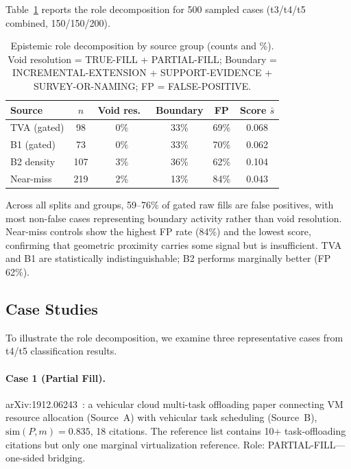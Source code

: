 \documentclass[sigconf]{acmart}
\begin{document}
Table~\ref{tab:roles} reports the role decomposition for 500 sampled cases
(t3/t4/t5 combined, 150/150/200).

\begin{table}[h]
\centering
\caption{Epistemic role decomposition by source group (counts and \%).
Void resolution = TRUE-FILL + PARTIAL-FILL;
Boundary = INCREMENTAL-EXTENSION + SUPPORT-EVIDENCE + SURVEY-OR-NAMING;
FP = FALSE-POSITIVE.}
\label{tab:roles}
\begin{tabular}{lccccc}
\toprule
Source & $n$ & Void res.\ & Boundary & FP & Score $\bar{s}$ \\
\midrule
TVA (gated)     & 98  & 0\%   & 33\%  & 69\% & 0.068 \\
B1 (gated)      & 73  & 0\%   & 33\%  & 70\% & 0.062 \\
B2 density      & 107 & 3\%   & 36\%  & 62\% & 0.104 \\
Near-miss       & 219 & 2\%   & 13\%  & 84\% & 0.043 \\
\bottomrule
\end{tabular}
\end{table}

Across all splits and groups, 59--76\% of gated raw fills are false positives,
with most non-false cases representing boundary activity rather than void resolution.
Near-miss controls show the highest FP rate (84\%) and the lowest score,
confirming that geometric proximity carries some signal but is insufficient.
TVA and B1 are statistically indistinguishable; B2 performs marginally better (FP 62\%).

\subsection{Case Studies}
\label{sec:cases}

To illustrate the role decomposition, we examine three representative cases from
t4/t5 classification results.

\paragraph{Case 1 (Partial Fill).}
arXiv:1912.06243~\cite{case1}: a vehicular cloud multi-task offloading paper connecting
VM resource allocation (Source~A) with vehicular task scheduling (Source~B),
$\mathrm{sim}(P, m) = 0.835$, 18 citations.
The reference list contains 10+ task-offloading citations but only one marginal
virtualization reference.
Role: PARTIAL-FILL---one-sided bridging.
\end{document}
